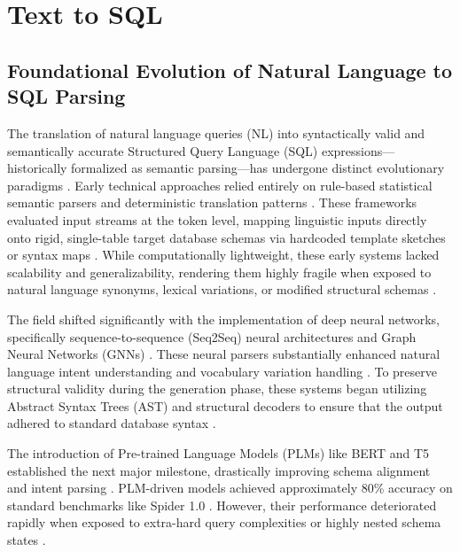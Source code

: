 \section{Text to SQL}

\subsection{Foundational Evolution of Natural Language to SQL Parsing}
The translation of natural language queries (NL) into syntactically valid and semantically accurate Structured Query
Language (SQL) expressions---historically formalized as semantic parsing---has undergone distinct evolutionary paradigms
\cite{Multi_Agent_Collaborative_Framework_for_Text_to_SQL, Text_to_SQL_in_the_Era_of_LLMs}. Early technical
approaches relied entirely on rule-based statistical semantic parsers and deterministic translation patterns
\cite{Text_to_SQL_in_the_Era_of_LLMs}. These frameworks evaluated input streams at the token level, mapping
linguistic inputs directly onto rigid, single-table target database schemas via hardcoded template sketches or syntax
maps \cite{Text_to_SQL_in_the_Era_of_LLMs}. While computationally lightweight, these early systems lacked
scalability and generalizability, rendering them highly fragile when exposed to natural language synonyms, lexical
variations, or modified structural schemas \cite{Text_to_SQL_in_the_Era_of_LLMs}.


The field shifted significantly with the implementation of deep neural networks, specifically sequence-to-sequence
(Seq2Seq) neural architectures and Graph Neural Networks (GNNs) \cite{Text_to_SQL_in_the_Era_of_LLMs}. These
neural parsers substantially enhanced natural language intent understanding and vocabulary variation handling
\cite{Text_to_SQL_in_the_Era_of_LLMs}. To preserve structural validity during the generation phase, these
systems began utilizing Abstract Syntax Trees (AST) and structural decoders to ensure that the output adhered to
standard database syntax \cite{Multi_Agent_Collaborative_Framework_for_Text_to_SQL,
Text_to_SQL_in_the_Era_of_LLMs}.


The introduction of Pre-trained Language Models (PLMs) like BERT and T5 established the next major milestone,
drastically improving schema alignment and intent parsing \cite{Text_to_SQL_in_the_Era_of_LLMs}. PLM-driven
models achieved approximately 80\% accuracy on standard benchmarks like Spider 1.0
\cite{Text_to_SQL_in_the_Era_of_LLMs}. However, their performance deteriorated rapidly when exposed to
extra-hard query complexities or highly nested schema states \cite{Text_to_SQL_in_the_Era_of_LLMs}.


